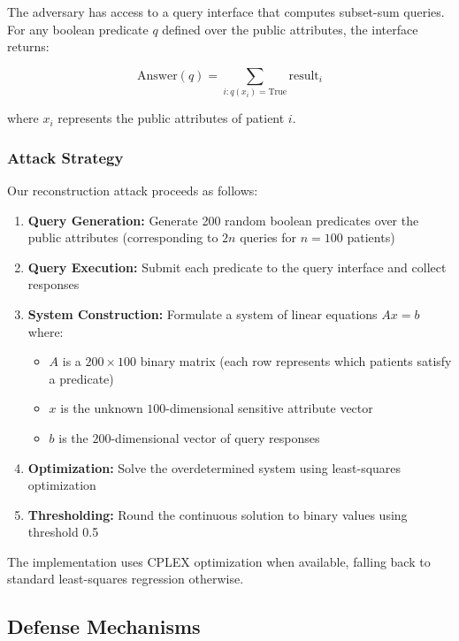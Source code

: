 \documentclass[11pt,letterpaper]{article}
\begin{document}
The adversary has access to a query interface that computes subset-sum queries. For any boolean predicate $q$ defined over the public attributes, the interface returns:

\begin{equation}
    \text{Answer}(q) = \sum_{i: q(x_i) = \text{True}} \text{result}_i
\end{equation}

where $x_i$ represents the public attributes of patient $i$.

\subsubsection{Attack Strategy}

Our reconstruction attack proceeds as follows:

\begin{enumerate}[leftmargin=*]
    \item \textbf{Query Generation:} Generate 200 random boolean predicates over the public attributes (corresponding to $2n$ queries for $n=100$ patients)
    \item \textbf{Query Execution:} Submit each predicate to the query interface and collect responses
    \item \textbf{System Construction:} Formulate a system of linear equations $Ax = b$ where:
    \begin{itemize}
        \item $A$ is a $200 \times 100$ binary matrix (each row represents which patients satisfy a predicate)
        \item $x$ is the unknown $100$-dimensional sensitive attribute vector
        \item $b$ is the $200$-dimensional vector of query responses
    \end{itemize}
    \item \textbf{Optimization:} Solve the overdetermined system using least-squares optimization
    \item \textbf{Thresholding:} Round the continuous solution to binary values using threshold 0.5
\end{enumerate}

The implementation uses CPLEX optimization when available, falling back to standard least-squares regression otherwise.

\subsection{Defense Mechanisms}
\end{document}

